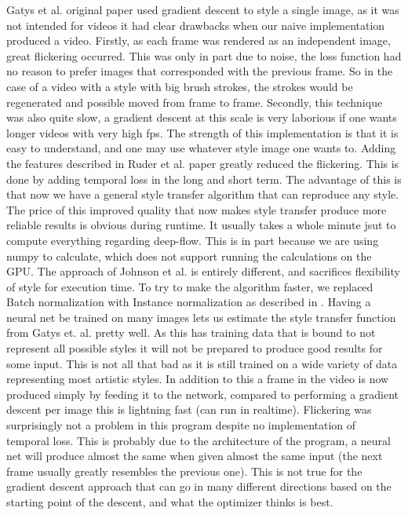 Gatys et al. \cite{Gatys:1} original paper used gradient descent to style a single image, as it was not intended for videos it had clear drawbacks when our naive implementation produced a video. Firstly, as each frame was rendered as an independent image, great flickering occurred. This was only in part due to noise, the loss function had no reason to prefer images that corresponded with the previous frame. So in the case of a video with a style with big brush strokes, the strokes would be regenerated and possible moved from frame to frame. Secondly, this technique was also quite slow, a gradient descent at this scale is very laborious if one wants longer videos with very high fps. The strength of this implementation is that it is easy to understand, and one may use whatever style image one wants to.\newline\newline
Adding the features described in Ruder et al. \cite{Ruder:1} paper greatly reduced the flickering. This is done by adding temporal loss in the long and short term. The advantage of this is that now we have a general style transfer algorithm that can reproduce any style. The price of this improved quality that now makes style transfer produce more reliable results is obvious during runtime. It usually takes a whole minute jsut to compute everything regarding deep-flow. This is in part because we are using numpy to calculate, which does not support running the calculations on the GPU.\newline\newline
The approach of Johnson et al. \cite{Johnson:1} is entirely different, and sacrifices flexibility of style for execution time. To try to make the algorithm faster, we replaced Batch normalization with Instance normalization as described in \cite{Ulyanov:1}. Having a neural net be trained on many images lets us estimate the style transfer function from Gatys et. al. \cite{Gatys:1} pretty well. As this has training data that is bound to not represent all possible styles it will not be prepared to produce good results for some input. This is not all that bad as it is still trained on a wide variety of data representing most artistic styles. In addition to this a frame in the video is now produced simply by feeding it to the network, compared to performing a gradient descent per image this is lightning fast (can run in realtime). Flickering was surprisingly not a problem in this program despite no implementation of temporal loss. This is probably due to the architecture of the program, a neural net will produce almost the same when given almost the same input (the next frame usually greatly resembles the previous one). This is not true for the gradient descent approach that can go in many different directions based on the starting point of the descent, and what the optimizer thinks is best.\newline\newline

